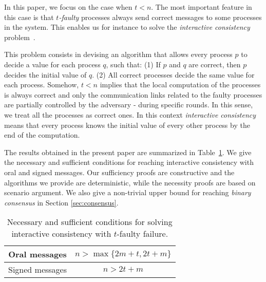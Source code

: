 \documentclass[11pt]{article}
\newcommand{\tmem}[1]{{\em #1\/}}
\begin{document}
In this paper, we focus on the case when $t<n$.
The most important feature in this case is that {\tmem{$t$-faulty}}
processes always send correct messages to some processes in the system.
This enables us for instance to solve the \tmem{interactive consistency} problem~\cite{fischer1983consensus}.

This problem consists in devising an algorithm
that allows every process $p$ to decide a value for each process $q$,
such that: (1) If $p$ and $q$ are correct, then $p$ decides the
initial value of $q$. (2) All correct processes decide the same
value for each process. Somehow, $t<n$ implies that the local
computation of the processes is always correct and only the
communication links related to the faulty processes are partially
controlled by the adversary - during specific rounds.
In this sense, we treat all the processes as
correct ones. In this context {\tmem{interactive consistency}}
means that every process knows the initial value of every other
process by the end of the computation.

The results obtained in the present paper are summarized in
Table~\ref{tab:results}. We give the necessary and sufficient
conditions for reaching interactive consistency with oral and signed
messages. Our sufficiency proofs are constructive and the algorithms
we provide are deterministic, while the necessity proofs are based on
scenario argument.
We also give a non-trivial upper bound for reaching \tmem{binary consensus} in Section \ref{sec:consensus}.


\begin{table}[h]
\centering
\begin{tabular}{|c|c|}
\hline
Oral messages & $n> \max \{ 2m+t,2t+m \}$\\
\hline
Signed messages & $n>2t+m$\\
\hline
\end{tabular}
\caption{\label{tab:results}Necessary and sufficient conditions for solving
interactive consistency with $t$-faulty failure.}
\end{table}











\newpage




\newpage
\appendix

\end{document}
